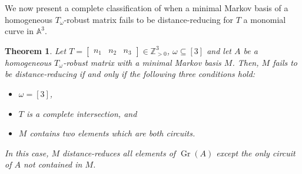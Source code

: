 \documentclass[a4paper, 12pt]{article}
\newcommand{\ZZ}{\mathbb Z}
\theoremstyle{plain}
\newtheorem{theorem}{Theorem}[section]
\newtheorem{lemma}[theorem]{Lemma}
\theoremstyle{definition}
\theoremstyle{remark}
\begin{document}

We now present a complete classification of when a minimal Markov basis of a homogeneous $T_{\omega}$-robust matrix fails to be distance-reducing for $T$ a monomial curve in $\mathbb{A}^3$.

\begin{theorem} \label{thm:A3class}
    Let $T=\begin{bmatrix}
        n_1 & n_2 & n_3
    \end{bmatrix} \in  \ZZ_{>0}^3$, $\omega \subseteq [3]$ and let $A$ be a homogeneous $T_{\omega}$-robust matrix with a minimal Markov basis $M$. Then, $M$ fails to be distance-reducing if and only if the following three conditions hold:
    \begin{itemize}
        \item $\omega=[3]$,
        \item $T$ is a complete intersection, and
        \item  $M$ contains two elements which are both circuits.
    \end{itemize}
In this case, $M$ distance-reduces all elements of $\operatorname{Gr}(A)$ except the only circuit of $A$ not contained in $M$.
\end{theorem}
\end{document}
